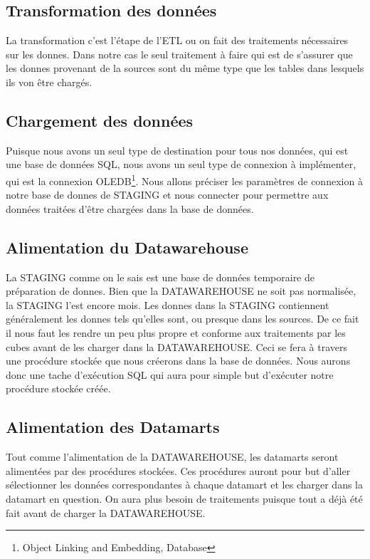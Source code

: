 \subsection{Transformation des données}
La transformation c’est l’étape de l’ETL ou on fait des traitements nécessaires sur les donnes. Dans notre cas le seul traitement à faire qui est de s’assurer que les donnes provenant de la sources sont du même type que les tables dans lesquels ils von être chargés. 

\subsection{Chargement des données}
Puisque nous avons un seul type de destination pour tous nos données, qui est une base de données SQL, nous avons un seul type de connexion à implémenter, qui est la connexion OLEDB\footnote{Object Linking and Embedding, Database}. Nous allons préciser les paramètres de connexion à notre base de donnes de STAGING et nous connecter pour permettre aux données traitées d’être chargées dans la base de données.

\subsection{Alimentation du Datawarehouse}
La STAGING comme on le sais est une base de données temporaire de préparation de donnes. Bien que la DATAWAREHOUSE ne soit pas normalisée, la STAGING l’est encore mois. Les donnes dans la STAGING contiennent généralement les donnes tels qu’elles sont, ou presque dans les sources. De ce fait il nous faut les rendre un peu plus propre et conforme aux traitements par les cubes avant de les charger dans la DATAWAREHOUSE. Ceci se fera à travers une procédure stockée que nous créerons dans la base de données. Nous aurons donc une tache d’exécution SQL qui aura pour simple but d’exécuter notre procédure stockée créée.


\subsection{Alimentation des Datamarts}
Tout comme l'alimentation de la DATAWAREHOUSE, les datamarts seront alimentées par des procédures stockées. Ces procédures auront pour but d’aller sélectionner les données correspondantes à chaque datamart et les charger dans la datamart en question. On aura plus besoin de traitements puisque tout a déjà été fait avant de charger la DATAWAREHOUSE.


